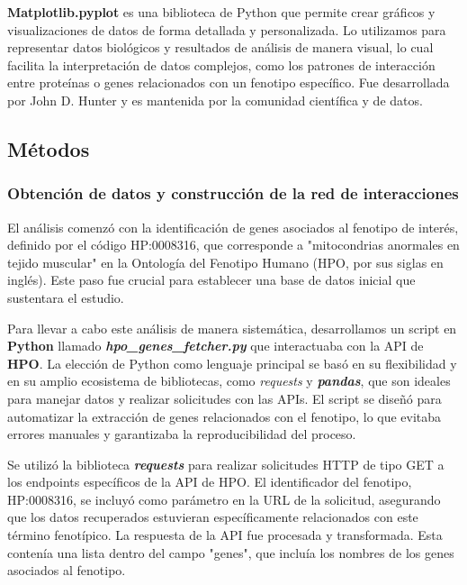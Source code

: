 \textbf{Matplotlib.pyplot} es una biblioteca de Python que permite crear gráficos y visualizaciones de datos de forma detallada y personalizada.
Lo utilizamos para representar datos biológicos y resultados de análisis de manera visual, lo cual facilita la interpretación de datos complejos, como los patrones de interacción entre proteínas o genes relacionados con un fenotipo específico.
Fue desarrollada por John D. Hunter y es mantenida por la comunidad científica y de datos.\cite{ari2014matplotlib}



\subsection{\textbf{Métodos}}

\subsubsection{Obtención de datos y construcción de la red de interacciones}

El análisis comenzó con la identificación de genes asociados al fenotipo de interés, definido por el código HP:0008316, que corresponde a "mitocondrias anormales en tejido muscular" en la Ontología del Fenotipo Humano (HPO, por sus siglas en inglés). Este paso fue crucial para establecer una base de datos inicial que sustentara el estudio.

Para llevar a cabo este análisis de manera sistemática, desarrollamos un script en \textbf{Python} llamado \textbf{\textit{hpo\_genes\_fetcher.py}} que interactuaba con la API de \textbf{HPO}. La elección de Python como lenguaje principal se basó en su flexibilidad y en su amplio ecosistema de bibliotecas, como \textit{requests} y \textbf{\textit{pandas}}, que son ideales para manejar datos y realizar solicitudes con las APIs. El script se diseñó para automatizar la extracción de genes relacionados con el fenotipo, lo que evitaba errores manuales y garantizaba la reproducibilidad del proceso.

Se utilizó la biblioteca \textbf{\textit{requests}} para realizar solicitudes HTTP de tipo GET a los endpoints específicos de la API de HPO. El identificador del fenotipo, HP:0008316, se incluyó como parámetro en la URL de la solicitud, asegurando que los datos recuperados estuvieran específicamente relacionados con este término fenotípico. La respuesta de la API fue procesada y transformada. Esta contenía una lista dentro del campo "genes", que incluía los nombres de los genes asociados al fenotipo.

